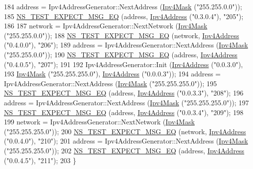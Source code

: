 \begin{DoxyCode}
184   address = Ipv4AddressGenerator::NextAddress (\hyperlink{classns3_1_1Ipv4Mask}{Ipv4Mask} (\textcolor{stringliteral}{"255.255.0.0"}));
185   \hyperlink{group__testing_ga7304ba46a28d8cf08dfdfd6499cf7068}{NS\_TEST\_EXPECT\_MSG\_EQ} (address, \hyperlink{classns3_1_1Ipv4Address}{Ipv4Address} (\textcolor{stringliteral}{"0.3.0.4"}), \textcolor{stringliteral}{"205"});
186 
187   network = Ipv4AddressGenerator::NextNetwork (\hyperlink{classns3_1_1Ipv4Mask}{Ipv4Mask} (\textcolor{stringliteral}{"255.255.0.0"}));
188   \hyperlink{group__testing_ga7304ba46a28d8cf08dfdfd6499cf7068}{NS\_TEST\_EXPECT\_MSG\_EQ} (network, \hyperlink{classns3_1_1Ipv4Address}{Ipv4Address} (\textcolor{stringliteral}{"0.4.0.0"}), \textcolor{stringliteral}{"206"});
189   address = Ipv4AddressGenerator::NextAddress (\hyperlink{classns3_1_1Ipv4Mask}{Ipv4Mask} (\textcolor{stringliteral}{"255.255.0.0"}));
190   \hyperlink{group__testing_ga7304ba46a28d8cf08dfdfd6499cf7068}{NS\_TEST\_EXPECT\_MSG\_EQ} (address, \hyperlink{classns3_1_1Ipv4Address}{Ipv4Address} (\textcolor{stringliteral}{"0.4.0.5"}), \textcolor{stringliteral}{"207"});
191 
192   Ipv4AddressGenerator::Init (\hyperlink{classns3_1_1Ipv4Address}{Ipv4Address} (\textcolor{stringliteral}{"0.0.3.0"}),
193                               \hyperlink{classns3_1_1Ipv4Mask}{Ipv4Mask} (\textcolor{stringliteral}{"255.255.255.0"}), \hyperlink{classns3_1_1Ipv4Address}{Ipv4Address} (\textcolor{stringliteral}{"0.0.0.3"}));
194   address = Ipv4AddressGenerator::NextAddress (\hyperlink{classns3_1_1Ipv4Mask}{Ipv4Mask} (\textcolor{stringliteral}{"255.255.255.0"}));
195   \hyperlink{group__testing_ga7304ba46a28d8cf08dfdfd6499cf7068}{NS\_TEST\_EXPECT\_MSG\_EQ} (address, \hyperlink{classns3_1_1Ipv4Address}{Ipv4Address} (\textcolor{stringliteral}{"0.0.3.3"}), \textcolor{stringliteral}{"208"});
196   address = Ipv4AddressGenerator::NextAddress (\hyperlink{classns3_1_1Ipv4Mask}{Ipv4Mask} (\textcolor{stringliteral}{"255.255.255.0"}));
197   \hyperlink{group__testing_ga7304ba46a28d8cf08dfdfd6499cf7068}{NS\_TEST\_EXPECT\_MSG\_EQ} (address, \hyperlink{classns3_1_1Ipv4Address}{Ipv4Address} (\textcolor{stringliteral}{"0.0.3.4"}), \textcolor{stringliteral}{"209"});
198 
199   network = Ipv4AddressGenerator::NextNetwork (\hyperlink{classns3_1_1Ipv4Mask}{Ipv4Mask} (\textcolor{stringliteral}{"255.255.255.0"}));
200   \hyperlink{group__testing_ga7304ba46a28d8cf08dfdfd6499cf7068}{NS\_TEST\_EXPECT\_MSG\_EQ} (network, \hyperlink{classns3_1_1Ipv4Address}{Ipv4Address} (\textcolor{stringliteral}{"0.0.4.0"}), \textcolor{stringliteral}{"210"});
201   address = Ipv4AddressGenerator::NextAddress (\hyperlink{classns3_1_1Ipv4Mask}{Ipv4Mask} (\textcolor{stringliteral}{"255.255.255.0"}));
202   \hyperlink{group__testing_ga7304ba46a28d8cf08dfdfd6499cf7068}{NS\_TEST\_EXPECT\_MSG\_EQ} (address, \hyperlink{classns3_1_1Ipv4Address}{Ipv4Address} (\textcolor{stringliteral}{"0.0.4.5"}), \textcolor{stringliteral}{"211"});
203 \}
\end{DoxyCode}
